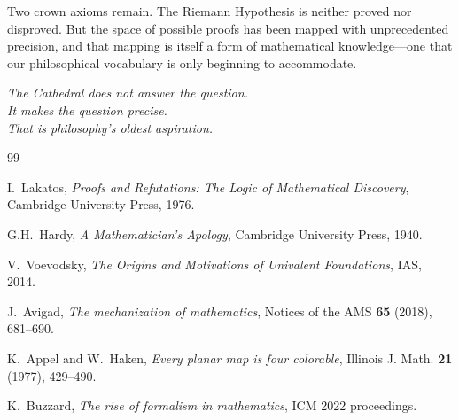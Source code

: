 \documentclass[11pt,a4paper]{article}
\begin{document}
Two crown axioms remain. The Riemann Hypothesis is neither proved nor
disproved. But the space of possible proofs has been mapped with
unprecedented precision, and that mapping is itself a form of
mathematical knowledge---one that our philosophical vocabulary is
only beginning to accommodate.

\vspace{1cm}
\begin{flushright}
\emph{The Cathedral does not answer the question.}\\
\emph{It makes the question precise.}\\
\emph{That is philosophy's oldest aspiration.}
\end{flushright}

\vspace{1cm}

\begin{thebibliography}{99}

I.~Lakatos, \emph{Proofs and Refutations: The Logic of Mathematical
Discovery}, Cambridge University Press, 1976.

G.H.~Hardy, \emph{A Mathematician's Apology}, Cambridge University
Press, 1940.

V.~Voevodsky, \emph{The Origins and Motivations of Univalent
Foundations}, IAS, 2014.

J.~Avigad, \emph{The mechanization of mathematics}, Notices of the
AMS \textbf{65} (2018), 681--690.

K.~Appel and W.~Haken, \emph{Every planar map is four colorable},
Illinois J. Math. \textbf{21} (1977), 429--490.

K.~Buzzard, \emph{The rise of formalism in mathematics},
ICM 2022 proceedings.

\end{thebibliography}
\end{document}
